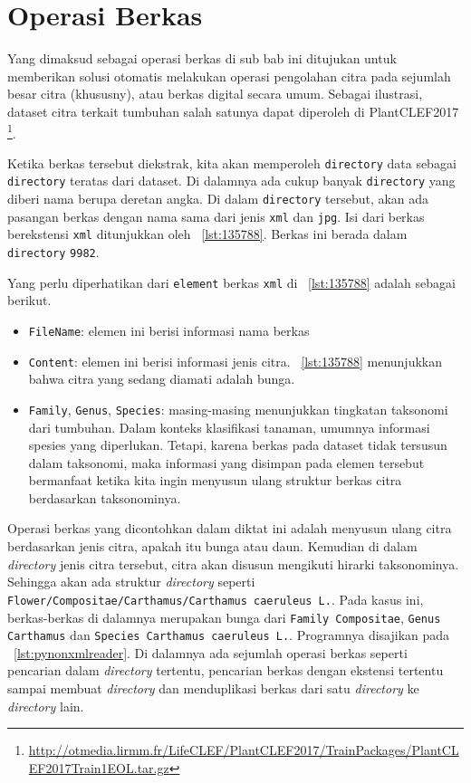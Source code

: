 \section{Operasi Berkas}

Yang dimaksud sebagai operasi berkas di sub bab ini ditujukan untuk memberikan solusi otomatis melakukan operasi pengolahan citra pada sejumlah besar citra (khususny), atau berkas digital secara umum. Sebagai ilustrasi, dataset citra terkait tumbuhan salah satunya dapat diperoleh di PlantCLEF2017 \footnote{\url{http://otmedia.lirmm.fr/LifeCLEF/PlantCLEF2017/TrainPackages/PlantCLEF2017Train1EOL.tar.gz}}.

Ketika berkas tersebut diekstrak, kita akan memperoleh \texttt{directory} data sebagai \texttt{directory} teratas dari dataset. Di dalamnya ada cukup banyak \texttt{directory} yang diberi nama berupa deretan angka. Di dalam \texttt{directory} tersebut, akan ada pasangan berkas dengan nama sama dari jenis \texttt{xml} dan \texttt{jpg}. Isi dari berkas berekstensi \texttt{xml} ditunjukkan oleh \lstlistingname~\ref{lst:135788}. Berkas ini berada dalam \texttt{directory} \texttt{9982}.

\scriptsize

\normalsize

Yang perlu diperhatikan dari \texttt{element} berkas \texttt{xml} di \lstlistingname~\ref{lst:135788} adalah sebagai berikut.
\begin{itemize}
  \item \texttt{FileName}: elemen ini berisi informasi nama berkas
  \item \texttt{Content}: elemen ini berisi informasi jenis citra. \lstlistingname~\ref{lst:135788} menunjukkan bahwa citra yang sedang diamati adalah bunga.
  \item \texttt{Family}, \texttt{Genus}, \texttt{Species}: masing-masing menunjukkan tingkatan taksonomi dari tumbuhan. Dalam konteks klasifikasi tanaman, umumnya informasi spesies yang diperlukan. Tetapi, karena berkas pada dataset tidak tersusun dalam taksonomi, maka informasi yang disimpan pada elemen tersebut bermanfaat ketika kita ingin menyusun ulang struktur berkas citra berdasarkan taksonominya.
\end{itemize}

Operasi berkas yang dicontohkan dalam diktat ini adalah menyusun ulang citra berdasarkan jenis citra, apakah itu bunga atau daun. Kemudian di dalam \textit{directory} jenis citra tersebut, citra akan disusun mengikuti hirarki taksonominya. Sehingga akan ada struktur \textit{directory} seperti \texttt{Flower/Compositae/Carthamus/Carthamus\ caeruleus\ L.}. Pada kasus ini, berkas-berkas di dalamnya merupakan bunga dari \texttt{Family Compositae}, \texttt{Genus Carthamus} dan \texttt{Species Carthamus\ caeruleus\ L.}. Programnya disajikan pada \lstlistingname~\ref{lst:pynonxmlreader}. Di dalamnya ada sejumlah operasi berkas seperti pencarian dalam \textit{directory} tertentu, pencarian berkas dengan ekstensi tertentu sampai membuat \textit{directory} dan menduplikasi berkas dari satu \textit{directory} ke \textit{directory} lain.

